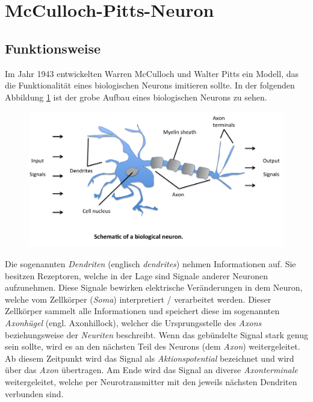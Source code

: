 \section{McCulloch-Pitts-Neuron} \label{sc:mpn}

\subsection{Funktionsweise}

Im Jahr 1943 entwickelten Warren McCulloch und Walter Pitts ein Modell, das die Funktionalität eines biologischen Neurons imitieren sollte. In der folgenden Abbildung \ref{fig:bioNeuron} ist der grobe Aufbau eines biologischen Neurons zu sehen. 

\begin{figure}[!htb]
	\centering
	\includegraphics[width=\linewidth]{img/bioNeuron}
	\label{fig:bioNeuron}
\end{figure}

Die sogenannten \emph{Dendriten} (englisch \emph{dendrites}) nehmen Informationen auf. Sie besitzen Rezeptoren, welche in der Lage sind Signale anderer Neuronen aufzunehmen. Diese Signale bewirken elektrische Veränderungen in dem Neuron, welche vom Zellkörper (\emph{Soma}) interpretiert / verarbeitet werden. Dieser Zellkörper sammelt alle Informationen und speichert diese im sogenannten \emph{Axonhügel} (engl. Axonhillock), welcher die Ursprungsstelle des \emph{Axons} beziehungsweise der \emph{Neuriten} beschreibt. Wenn das gebündelte Signal stark genug sein sollte, wird es an den nächsten Teil des Neurons (dem \emph{Axon}) weitergeleitet. Ab diesem Zeitpunkt wird das Signal als \emph{Aktionspotential} bezeichnet und wird über das \emph{Axon} übertragen. Am Ende wird das Signal an diverse \emph{Axonterminale} weitergeleitet, welche per Neurotransmitter mit den jeweils nächsten Dendriten verbunden sind. 

